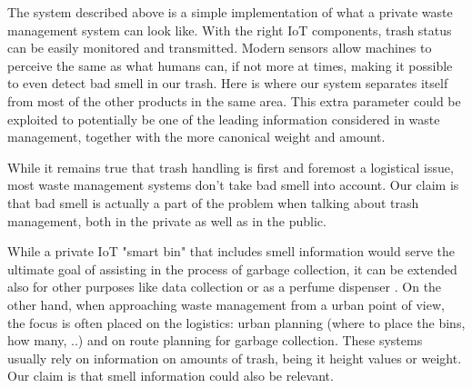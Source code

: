 The system described above is a simple implementation of what a private waste management system can look like. 
With the right IoT components, trash status can be easily monitored and transmitted.
Modern sensors allow machines to perceive the same as what humans can, if not more at times, making it possible to even detect bad smell in our trash.
Here is where our system separates itself from most of the other products in the same area.
This extra parameter could be exploited to potentially be one of the leading information considered in waste management, together with the more canonical weight and amount. 

While it remains true that trash handling is first and foremost a logistical issue, most waste management systems don't take bad smell into account.
Our claim is that bad smell is actually a part of the problem when talking about trash management,  both in the private as well as in the public.

While a private IoT "smart bin" that includes smell information would serve the ultimate goal of assisting in the process of garbage collection, it can be extended also for other purposes like data collection or as a perfume dispenser \cite{perfume}.
On the other hand, when approaching waste management from a urban point of view, the focus is often placed on the logistics: urban planning (where to place the bins, how many, ..) and on route planning for garbage collection.
These systems usually rely on information on amounts of trash, being it height values or weight.
Our claim  is that smell information could also be relevant.
